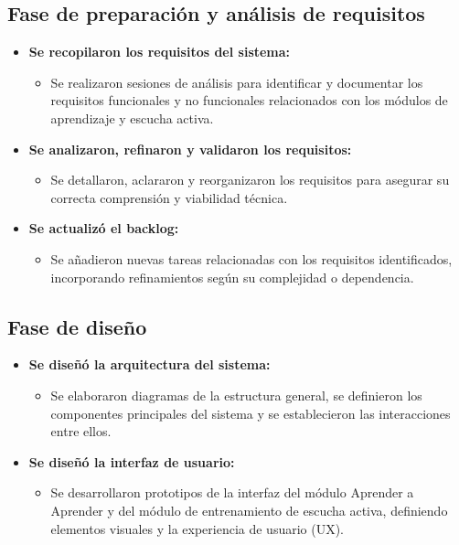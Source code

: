 \subsection{Fase de preparación y análisis de requisitos}

\begin{itemize}
    \item \textbf{Se recopilaron los requisitos del sistema:}
    \begin{itemize}
        \item Se realizaron sesiones de análisis para identificar y documentar los requisitos funcionales y no funcionales relacionados con los módulos de aprendizaje y escucha activa.
    \end{itemize}

    \item \textbf{Se analizaron, refinaron y validaron los requisitos:}
    \begin{itemize}
        \item Se detallaron, aclararon y reorganizaron los requisitos para asegurar su correcta comprensión y viabilidad técnica.
    \end{itemize}

    \item \textbf{Se actualizó el backlog:}
    \begin{itemize}
        \item Se añadieron nuevas tareas relacionadas con los requisitos identificados, incorporando refinamientos según su complejidad o dependencia.
    \end{itemize}
\end{itemize}

\subsection{Fase de diseño}

\begin{itemize}
    \item \textbf{Se diseñó la arquitectura del sistema:}
    \begin{itemize}
        \item Se elaboraron diagramas de la estructura general, se definieron los componentes principales del sistema y se establecieron las interacciones entre ellos.
    \end{itemize}

    \item \textbf{Se diseñó la interfaz de usuario:}
    \begin{itemize}
        \item Se desarrollaron prototipos de la interfaz del módulo Aprender a Aprender y del módulo de entrenamiento de escucha activa, definiendo elementos visuales y la experiencia de usuario (UX).
    \end{itemize}
\end{itemize}

